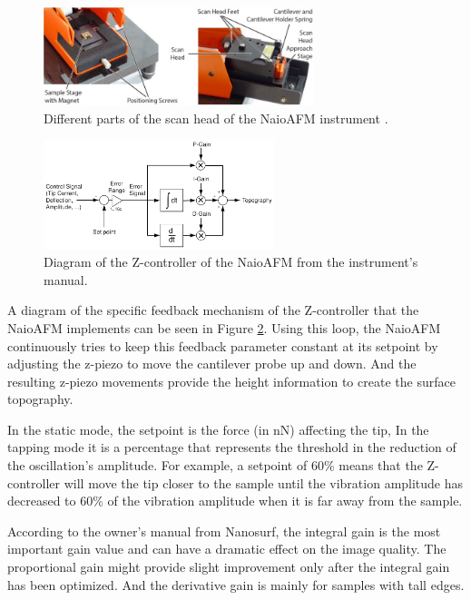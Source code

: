 \documentclass[11pt,a4paper]{article}
\begin{document}
\begin{figure}[hbt]
\centering
\includegraphics[width=0.7\textwidth]{naioafm2}
\caption{Different parts of the scan head of the NaioAFM instrument \cite{NaioAFM}.}
\label{fig:naioafm}
\end{figure}

\begin{figure}[hbt]
\centering
\includegraphics[width=0.6\textwidth]{Feedback_NaioAFM}
\caption{Diagram of the Z-controller of the NaioAFM from the instrument's manual.}
\label{fig:feedback_z-controller}
\end{figure}

A diagram of the specific feedback mechanism of the Z-controller that the NaioAFM implements can be seen in Figure \ref{fig:feedback_z-controller}. Using this loop, the NaioAFM continuously tries to keep this feedback parameter constant at its setpoint by adjusting the z-piezo to move the cantilever probe up and down. And the resulting z-piezo movements provide the height information to create the surface topography.

In the static mode, the setpoint is the force (in \si{\nano \N}) affecting the tip, In the tapping mode it is a percentage that represents the threshold in the reduction of the oscillation's amplitude. For example, a setpoint of 60\% means that the Z-controller will move the tip closer to the sample until the vibration amplitude has decreased to 60\% of the vibration amplitude when it is far away from the sample.

According to the owner's manual from Nanosurf, the integral gain is the most important gain value and can have a dramatic effect on the image quality. The proportional gain might provide slight improvement only after the integral gain has been optimized. And the derivative gain is mainly for samples with tall edges.
\end{document}
